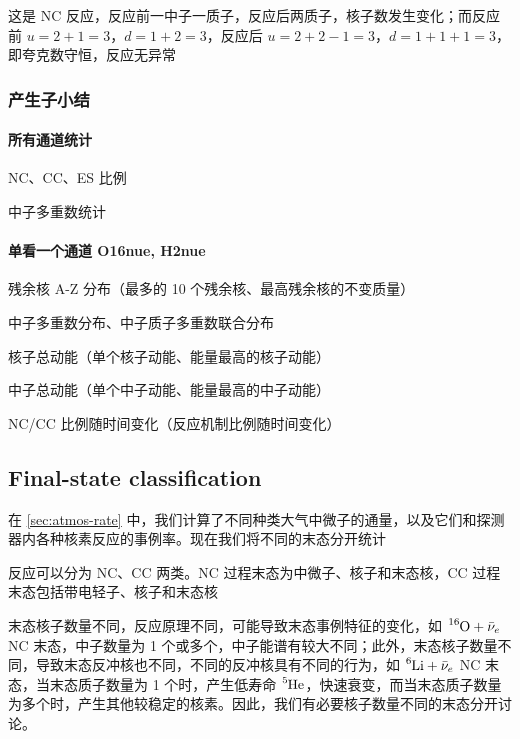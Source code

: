 \documentclass[12pt]{article}
\begin{document}
这是 NC 反应，反应前一中子一质子，反应后两质子，核子数发生变化；而反应前 $u = 2 + 1 = 3$，$d = 1 + 2 = 3$，反应后 $u = 2 + 2 - 1 = 3$，$d = 1 + 1 + 1 = 3$，即夸克数守恒，反应无异常

\subsubsection{产生子小结}

\paragraph{所有通道统计}

NC、CC、ES 比例

中子多重数统计

\paragraph{单看一个通道 O16nue, H2nue}

残余核 A-Z 分布（最多的 10 个残余核、最高残余核的不变质量）

中子多重数分布、中子质子多重数联合分布

核子总动能（单个核子动能、能量最高的核子动能）

中子总动能（单个中子动能、能量最高的中子动能）

NC/CC 比例随时间变化（反应机制比例随时间变化）

\paragraph{}
\paragraph{}

\subsection{Final-state classification}
在 \ref{sec:atmos-rate} 中，我们计算了不同种类大气中微子的通量，以及它们和探测器内各种核素反应的事例率。现在我们将不同的末态分开统计

反应可以分为 NC、CC 两类。NC 过程末态为中微子、核子和末态核，CC 过程末态包括带电轻子、核子和末态核

末态核子数量不同，反应原理不同，可能导致末态事例特征的变化，如 $\ce{^{16}O} + \bar{\nu}_e$ NC 末态，中子数量为 1 个或多个，中子能谱有较大不同；此外，末态核子数量不同，导致末态反冲核也不同，不同的反冲核具有不同的行为，如 $\ce{^{6}Li} + \bar{\nu}_e$ NC 末态，当末态质子数量为 1 个时，产生低寿命 $\ce{^{5}He}$，快速衰变，而当末态质子数量为多个时，产生其他较稳定的核素。因此，我们有必要核子数量不同的末态分开讨论。
\end{document}
